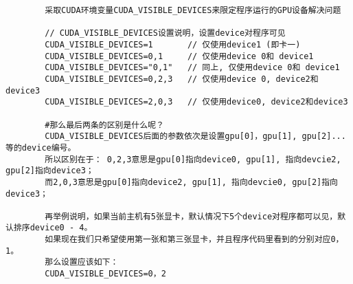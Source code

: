 \documentclass{ctexart}
\begin{document}
	\begin{verbatim}
		采取CUDA环境变量CUDA_VISIBLE_DEVICES来限定程序运行的GPU设备解决问题
		
		// CUDA_VISIBLE_DEVICES设置说明，设置device对程序可见
		CUDA_VISIBLE_DEVICES=1       // 仅使用device1 (即卡一)
		CUDA_VISIBLE_DEVICES=0,1     // 仅使用device 0和 device1
		CUDA_VISIBLE_DEVICES="0,1"	 // 同上, 仅使用device 0和 device1
		CUDA_VISIBLE_DEVICES=0,2,3   // 仅使用device 0, device2和device3
		CUDA_VISIBLE_DEVICES=2,0,3   // 仅使用device0, device2和device3
		
		#那么最后两条的区别是什么呢？
		CUDA_VISIBLE_DEVICES后面的参数依次是设置gpu[0]，gpu[1], gpu[2]...等的device编号。
		所以区别在于： 0,2,3意思是gpu[0]指向device0, gpu[1], 指向devcie2, gpu[2]指向device3；
		而2,0,3意思是gpu[0]指向device2, gpu[1], 指向devcie0, gpu[2]指向device3；
		
		再举例说明，如果当前主机有5张显卡，默认情况下5个device对程序都可以见，默认排序device0 - 4。
		如果现在我们只希望使用第一张和第三张显卡，并且程序代码里看到的分别对应0，1。
		那么设置应该如下：
		CUDA_VISIBLE_DEVICES=0，2
	\end{verbatim}
	
	
	\section{}
	
\end{document}
